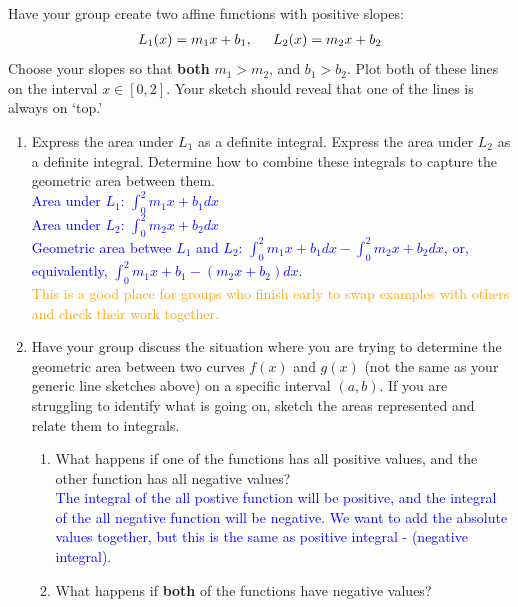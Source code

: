 \documentclass{ximera}
\begin{document}
\begin{exercise}
\end{exercise}





\begin{exercise}
    Have your group create two affine functions with positive slopes:
    \begin{align}
    	L_{1}(x) = m_{1}x + b_1, \hspace{.2in} L_{2}(x) = m_{2} x + b_2 \nonumber
    \end{align}
    Choose your slopes so that {\bf{both}} $m_{1} >m_2$, and $b_1>b_2$. Plot both of these lines on the interval $x\in [0,2]$. Your sketch should reveal that one of the lines is always on `top.'
    \begin{enumerate}
        \item Express the area under $L_{1}$ as a definite integral. Express the area under $L_2$ as a definite integral. Determine how to combine these integrals to capture the geometric area between them.\\
        \textcolor{blue}{Area under $L_1$: $\int_0^2 m_1 x+b_1dx$\\
        Area under $L_2$: $\int_0^2 m_2 x+b_2dx$\\
        Geometric area betwee $L_1$ and $L_2$: $\int_0^2 m_1 x+b_1dx-\int_0^2 m_2x+b_2dx$, or, equivalently, $\int_0^2 m_1x+b_1-(m_2x+b_2)dx$.}\\
        \textcolor{orange}{This is a good place for groups who finish early to swap examples with others and check their work together.}
        \item Have your group discuss the situation where you are trying to determine the geometric area between two curves $f(x)$ and $g(x)$ (not the same as your generic line sketches above) on a specific interval $(a,b)$. If you are struggling to identify what is going on, sketch the areas represented and relate them to integrals.
        \begin{enumerate}
            \item What happens if one of the functions has all positive values, and the other function has all negative values? \\
            \textcolor{blue}{The integral of the all postive function will be positive, and the integral of the all negative function will be negative.  We want to add the absolute values together, but this is the same as positive integral - (negative integral).}
            \item What happens if {\bf{both}} of the functions have negative values?\\

\end{enumerate}
\end{enumerate}
\end{exercise}
\end{document}
